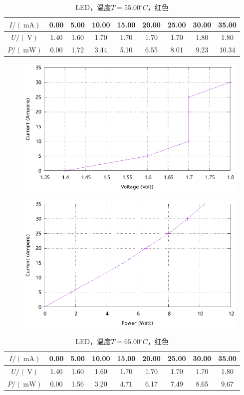 \documentclass{ctexart}
\newcommand{\si}[1]{\  \mathrm{#1}}
\begin{document}
\newpage
\begin{table}[H]
    \centering
    \begin{tabular}{|c|c|c|c|c|c|c|c|c|}
        \hline
        $I/(\si{mA})$ & 0.00 & 5.00 & 10.00 & 15.00 & 20.00 & 25.00 & 30.00 & 35.00 \\\hline
        $U / (\si{V})$  & 1.40 & 1.60 & 1.70 & 1.70 & 1.70 & 1.70 & 1.80 & 1.80 \\\hline
        $P / (\si{mW})$ & 0.00 & 1.72 & 3.44 & 5.10 & 6.55 & 8.01 & 9.23 & 10.34 \\\hline
    \end{tabular}
    \caption{LED，温度$T=55.00{}^{\circ}C$，红色}
\end{table}
\begin{figure}[H]
    \centering
    \includegraphics[width=0.9\linewidth]{../output/led-vc-7.gnuplot}
\end{figure}
\begin{figure}[H]
    \centering
    \includegraphics[width=0.9\linewidth]{../output/led-pc-7.gnuplot}
\end{figure}
\newpage
\begin{table}[H]
    \centering
    \begin{tabular}{|c|c|c|c|c|c|c|c|c|}
        \hline
        $I/(\si{mA})$ & 0.00 & 5.00 & 10.00 & 15.00 & 20.00 & 25.00 & 30.00 & 35.00 \\\hline
        $U / (\si{V})$  & 1.40 & 1.60 & 1.60 & 1.70 & 1.70 & 1.70 & 1.70 & 1.80 \\\hline
        $P / (\si{mW})$ & 0.00 & 1.56 & 3.20 & 4.71 & 6.17 & 7.49 & 8.65 & 9.67 \\\hline
    \end{tabular}
    \caption{LED，温度$T=65.00{}^{\circ}C$，红色}
\end{table}
\end{document}
